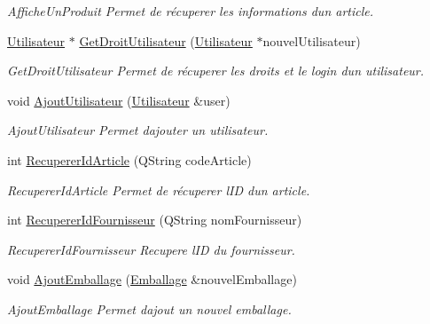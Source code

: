 \begin{DoxyCompactItemize}
\begin{DoxyCompactList}\small\item\em Affiche\+Un\+Produit Permet de récuperer les informations d\textquotesingle{}un article. \end{DoxyCompactList}\item 
\mbox{\hyperlink{class_utilisateur}{Utilisateur}} $\ast$ \mbox{\hyperlink{class_database_a11db260d702850148645c86c12da3a82}{Get\+Droit\+Utilisateur}} (\mbox{\hyperlink{class_utilisateur}{Utilisateur}} $\ast$nouvel\+Utilisateur)
\begin{DoxyCompactList}\small\item\em Get\+Droit\+Utilisateur Permet de récuperer les droits et le login d\textquotesingle{}un utilisateur. \end{DoxyCompactList}\item 
void \mbox{\hyperlink{class_database_ac9215994d89323fa31b0abdb98ab5463}{Ajout\+Utilisateur}} (\mbox{\hyperlink{class_utilisateur}{Utilisateur}} \&user)
\begin{DoxyCompactList}\small\item\em Ajout\+Utilisateur Permet d\textquotesingle{}ajouter un utilisateur. \end{DoxyCompactList}\item 
int \mbox{\hyperlink{class_database_a1f5de294783ac0aec3d44fd6faf4fd7c}{Recuperer\+Id\+Article}} (Q\+String code\+Article)
\begin{DoxyCompactList}\small\item\em Recuperer\+Id\+Article Permet de récuperer l\textquotesingle{}ID d\textquotesingle{}un article. \end{DoxyCompactList}\item 
int \mbox{\hyperlink{class_database_a56ab74f41841b337e2e19e790d524542}{Recuperer\+Id\+Fournisseur}} (Q\+String nom\+Fournisseur)
\begin{DoxyCompactList}\small\item\em Recuperer\+Id\+Fournisseur Recupere l\textquotesingle{}ID du fournisseur. \end{DoxyCompactList}\item 
void \mbox{\hyperlink{class_database_adbb6aa8fc1eec2686a5488fb167280f2}{Ajout\+Emballage}} (\mbox{\hyperlink{class_emballage}{Emballage}} \&nouvel\+Emballage)
\begin{DoxyCompactList}\small\item\em Ajout\+Emballage Permet d\textquotesingle{}ajout un nouvel emballage. \end{DoxyCompactList}\item 

\end{DoxyCompactItemize}
